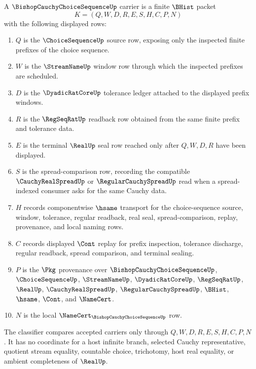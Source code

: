 \begin{definition}
\label{def:bishop-cauchy-choice-sequence-carrier}
A $\BishopCauchyChoiceSequenceUp$ carrier is a finite $\BHist$ packet
$$
K=(Q,W,D,R,E,S,H,C,P,N)
$$
with the following displayed rows:
\begin{enumerate}
\item $Q$ is the $\ChoiceSequenceUp$ source row, exposing only the inspected finite prefixes of the choice sequence.
\item $W$ is the $\StreamNameUp$ window row through which the inspected prefixes are scheduled.
\item $D$ is the $\DyadicRatCoreUp$ tolerance ledger attached to the displayed prefix windows.
\item $R$ is the $\RegSeqRatUp$ readback row obtained from the same finite prefix and tolerance data.
\item $E$ is the terminal $\RealUp$ seal row reached only after $Q,W,D,R$ have been displayed.
\item $S$ is the spread-comparison row, recording the compatible $\CauchyRealSpreadUp$ or $\RegularCauchySpreadUp$ read when a spread-indexed consumer asks for the same Cauchy data.
\item $H$ records componentwise $\hsame$ transport for the choice-sequence source, window, tolerance, regular readback, real seal, spread-comparison, replay, provenance, and local naming rows.
\item $C$ records displayed $\Cont$ replay for prefix inspection, tolerance discharge, regular readback, spread comparison, and terminal sealing.
\item $P$ is the $\Pkg$ provenance over $\BishopCauchyChoiceSequenceUp$, $\ChoiceSequenceUp$, $\StreamNameUp$, $\DyadicRatCoreUp$, $\RegSeqRatUp$, $\RealUp$, $\CauchyRealSpreadUp$, $\RegularCauchySpreadUp$, $\BHist$, $\hsame$, $\Cont$, and $\NameCert$.
\item $N$ is the local $\NameCert_{\BishopCauchyChoiceSequenceUp}$ row.
\end{enumerate}
The classifier compares accepted carriers only through $Q,W,D,R,E,S,H,C,P,N$. It has no coordinate for a host infinite branch, selected Cauchy representative, quotient stream equality, countable choice, trichotomy, host real equality, or ambient completeness of $\RealUp$.
\end{definition}


